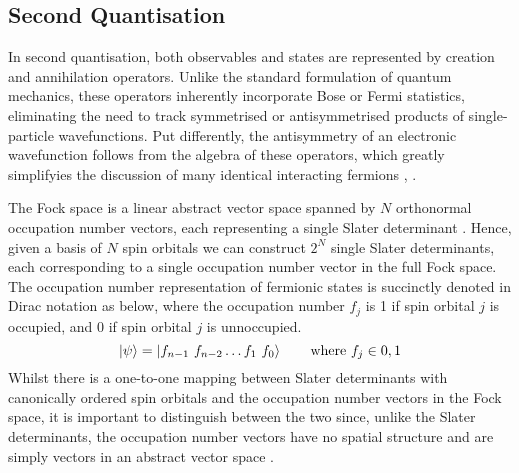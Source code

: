
\subsection{\label{second-quantisation}Second Quantisation}


In second quantisation, both observables and states are represented by creation and annihilation operators. Unlike the standard formulation of quantum mechanics, these operators inherently incorporate Bose or Fermi statistics, eliminating the need to track symmetrised or antisymmetrised products of single-particle wavefunctions. Put differently, the antisymmetry of an electronic wavefunction follows from the algebra of these operators, which greatly simplifyies the discussion of many identical interacting fermions \cite{Helgaker2000}, \cite{Fetter1972}.

The Fock space is a linear abstract vector space spanned by $N$ orthonormal occupation number vectors, each representing a single Slater determinant \cite{Helgaker2000}. Hence, given a basis of $N$ spin orbitals we can construct $2^N$ single Slater determinants, each corresponding to a single occupation number vector in the full Fock space. The occupation number representation of fermionic states is succinctly denoted in Dirac notation as below, where the occupation number $f_j$ is 1 if spin orbital $j$ is occupied, and 0 if spin orbital $j$ is unnoccupied.
\begin{equation*}
    \ket\psi = \ket{f_{n-1} \,\, f_{n-2} \dots f_{1} \,\, f_{0}} \qquad \text{where } f_{j} \in {0, 1}
\end{equation*}
Whilst there is a one-to-one mapping between Slater determinants with canonically ordered spin orbitals and the occupation number vectors in the Fock space, it is important to distinguish between the two since, unlike the Slater determinants, the occupation number vectors have no spatial structure and are simply vectors in an abstract vector space \cite{Helgaker2000}.

